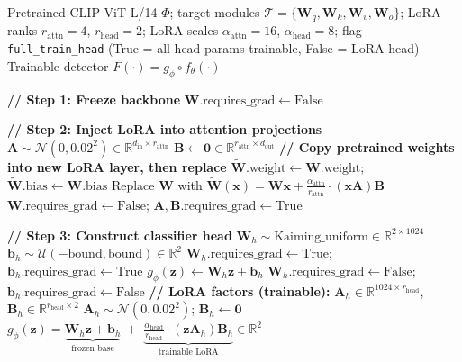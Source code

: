 \documentclass[12pt]{article}
\begin{document}
\begin{algorithm}[p]
\caption{Model Architecture: CLIP ViT-L/14 with LoRA Adaptation}
\label{alg:model}
\begin{algorithmic}[1]
\Require
  Pretrained CLIP ViT-L/14 $\Phi$; target modules $\mathcal{T} = \{\mathbf{W}_q, \mathbf{W}_k, \mathbf{W}_v, \mathbf{W}_o\}$;
  LoRA ranks $r_{\text{attn}} = 4$, $r_{\text{head}} = 2$;
  LoRA scales $\alpha_{\text{attn}} = 16$, $\alpha_{\text{head}} = 8$;
  flag \texttt{full\_train\_head} (True = all head params trainable, False = LoRA head)
\Ensure
  Trainable detector $F(\cdot) = g_\phi \circ f_\theta(\cdot)$

\State \textbf{// Step 1: Freeze backbone}
  \State $\mathbf{W}.\text{requires\_grad} \gets \text{False}$
\EndFor

\State \textbf{// Step 2: Inject LoRA into attention projections}
    \State $\mathbf{A} \sim \mathcal{N}(0, 0.02^2) \in \mathbb{R}^{d_{\text{in}} \times r_{\text{attn}}}$
    \State $\mathbf{B} \gets \mathbf{0} \in \mathbb{R}^{r_{\text{attn}} \times d_{\text{out}}}$
    \State \textbf{// Copy pretrained weights into new LoRA layer, then replace}
    \State $\widetilde{\mathbf{W}}.\text{weight} \gets \mathbf{W}.\text{weight}$; \quad $\widetilde{\mathbf{W}}.\text{bias} \gets \mathbf{W}.\text{bias}$
    \State Replace $\mathbf{W}$ with $\widetilde{\mathbf{W}}(\mathbf{x}) = \mathbf{W}\mathbf{x} + \frac{\alpha_{\text{attn}}}{r_{\text{attn}}} \cdot (\mathbf{x}\mathbf{A})\mathbf{B}$
    \State $\mathbf{W}.\text{requires\_grad} \gets \text{False}$; \quad $\mathbf{A},\mathbf{B}.\text{requires\_grad} \gets \text{True}$
  \EndIf
\EndFor

\State \textbf{// Step 3: Construct classifier head}
\State $\mathbf{W}_h \sim \text{Kaiming\_uniform} \in \mathbb{R}^{2 \times 1024}$
\State $\mathbf{b}_h \sim \mathcal{U}(-\text{bound}, \text{bound}) \in \mathbb{R}^{2}$
  \State $\mathbf{W}_h.\text{requires\_grad} \gets \text{True}$; \quad $\mathbf{b}_h.\text{requires\_grad} \gets \text{True}$
  \State $g_\phi(\mathbf{z}) \gets \mathbf{W}_h\mathbf{z} + \mathbf{b}_h$ 
\Else
  \State $\mathbf{W}_h.\text{requires\_grad} \gets \text{False}$; \quad $\mathbf{b}_h.\text{requires\_grad} \gets \text{False}$
  \State \textbf{// LoRA factors (trainable):} $\mathbf{A}_h \in \mathbb{R}^{1024 \times r_{\text{head}}}$, $\mathbf{B}_h \in \mathbb{R}^{r_{\text{head}} \times 2}$
  \State $\mathbf{A}_h \sim \mathcal{N}(0, 0.02^2)$; \quad $\mathbf{B}_h \gets \mathbf{0}$
  \State $g_\phi(\mathbf{z}) = \underbrace{\mathbf{W}_h\mathbf{z} + \mathbf{b}_h}_{\text{frozen base}} \;+\; \underbrace{\frac{\alpha_{\text{head}}}{r_{\text{head}}} \cdot (\mathbf{z}\mathbf{A}_h)\mathbf{B}_h}_{\text{trainable LoRA}} \in \mathbb{R}^{2}$
\EndIf


\end{algorithmic}
\end{algorithm}
\end{document}
